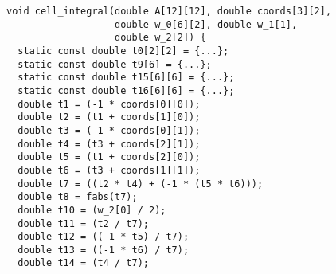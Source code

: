 \documentclass[presentation]{beamer}
\begin{document}
\begin{frame}
  \begin{columns}
    \begin{column}{0.5\textwidth}
\begin{verbatim}
void cell_integral(double A[12][12], double coords[3][2],
                   double w_0[6][2], double w_1[1],
                   double w_2[2]) {
  static const double t0[2][2] = {...};
  static const double t9[6] = {...};
  static const double t15[6][6] = {...};
  static const double t16[6][6] = {...};
  double t1 = (-1 * coords[0][0]);
  double t2 = (t1 + coords[1][0]);
  double t3 = (-1 * coords[0][1]);
  double t4 = (t3 + coords[2][1]);
  double t5 = (t1 + coords[2][0]);
  double t6 = (t3 + coords[1][1]);
  double t7 = ((t2 * t4) + (-1 * (t5 * t6)));
  double t8 = fabs(t7);
  double t10 = (w_2[0] / 2);
  double t11 = (t2 / t7);
  double t12 = ((-1 * t5) / t7);
  double t13 = ((-1 * t6) / t7);
  double t14 = (t4 / t7);


\end{verbatim}
\end{column}
\end{columns}
\end{frame}
\end{document}
